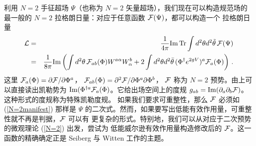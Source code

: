 利用 $N=2$ 手征超场 $\Psi$（也称为 $N=2$ 矢量超场），我们现在可以构造规范场的
最一般的 $N=2$ 拉格朗日量：对应于任意函数 ${\cal F}(\Psi)$，都可以构造一个
拉格朗日量
\begin{eqnarray}
{\cal L}&=& \frac{1}{4\pi}{\rm Im\,Tr}\int d^2\theta d^2\tilde\theta
\,{\cal F}(\Psi) 
\nonumber\\
&=&\frac{1}{8\pi}{\rm Im}\left(\int d^2\theta\, {\cal F}_{ab}(\Phi) 
W^{a\alpha}W^b_\alpha + 2\int d^2\theta d^2\bar\theta\, (\Phi^\dagger 
e^{2gV})^a {\cal F}_a(\Phi)\right)\,. 
\label{N=2general}
\end{eqnarray}
这里 ${\cal F}_a(\Phi)=\partial{\cal F}/\partial\Phi^a$，
${\cal F}_{ab}(\Phi)=\partial^2{\cal F}/\partial\Phi^a\partial\Phi^b$，
${\cal F}$ 称为 $N=2$ 预势。由上可以直接读出凯勒势为
${\rm Im}(\Phi^{\dagger a} {\cal F}_a(\Phi)$。它给出场空间上的度规
$g_{ab}={\rm Im}(\partial_a\partial_b{\cal F})$。这种形式的度规称为特殊凯勒度规。
如果我们要求可重整性，那么 ${\cal F}$ 必须如 (\ref{N=2manifest}) 那样是 $\Psi$
的二次式。然而，如果要写出低能有效作用量，可重整性就不再是判据，${\cal F}$ 可以有
更复杂的形式。特别地，我们可以从对应于二次预势的微观理论 (\ref{N=2}) 出发，尝试为
低能威尔逊有效作用量构造修改后的 ${\cal F}$。这一函数的精确确定正是 Seiberg 与
Witten 工作的主题。

